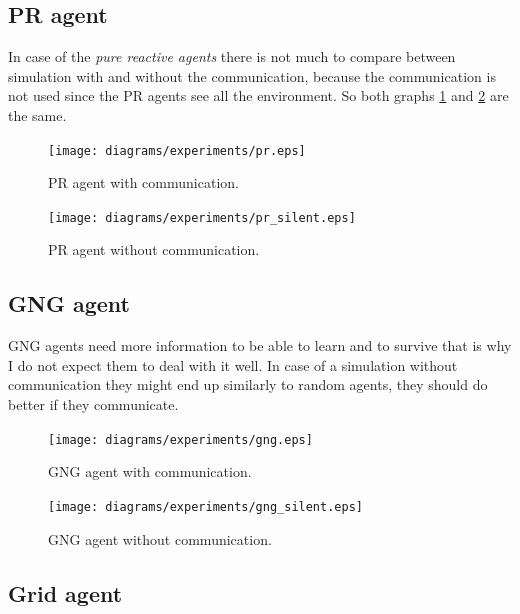 \subsection{PR agent}

In case of the \emph{pure reactive agents} there is not much to compare between simulation with and without the communication, because the communication is not used since the PR agents see all the environment. So both graphs \ref{experiments:pr} and \ref{experiments:pr-silent} are the same.

\begin{figure}
  \centering                                
  \texttt{[image: diagrams/experiments/pr.eps]}    
  \caption{PR agent with communication.}
  \label{experiments:pr}
\end{figure} 

\begin{figure}
  \centering                                
  \texttt{[image: diagrams/experiments/pr\_silent.eps]}    
  \caption{PR agent without communication.}
  \label{experiments:pr-silent}
\end{figure} 

\subsection{GNG agent}

GNG agents need more information to be able to learn and to survive that is why I do not expect them to deal with it well. In case of a simulation without communication they might end up similarly to random agents, they should do better if they communicate.

\begin{figure}
  \centering                                
  \texttt{[image: diagrams/experiments/gng.eps]}    
  \caption{GNG agent with communication.}
  \label{experiments:gng}
\end{figure} 

\begin{figure}
  \centering                                
  \texttt{[image: diagrams/experiments/gng\_silent.eps]}    
  \caption{GNG agent without communication.}
  \label{experiments:gng-silent}
\end{figure} 

\subsection{Grid agent}            

